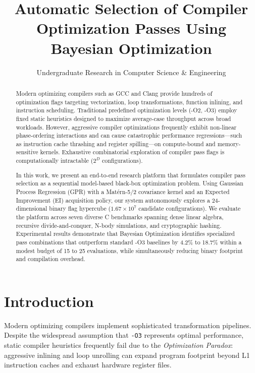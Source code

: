 \documentclass[sigconf,nonacm]{acmart}
\title{Automatic Selection of Compiler Optimization Passes Using Bayesian Optimization}
\author{Undergraduate Research in Computer Science \& Engineering}
\affiliation{%
  \institution{Department of Computer Science and Engineering}
  \country{India}
}
\begin{document}
\begin{abstract}
Modern optimizing compilers such as GCC and Clang provide hundreds of optimization flags targeting vectorization, loop transformations, function inlining, and instruction scheduling. Traditional predefined optimization levels (-O2, -O3) employ fixed static heuristics designed to maximize average-case throughput across broad workloads. However, aggressive compiler optimizations frequently exhibit non-linear phase-ordering interactions and can cause catastrophic performance regressions---such as instruction cache thrashing and register spilling---on compute-bound and memory-sensitive kernels. Exhaustive combinatorial exploration of compiler pass flags is computationally intractable ($2^D$ configurations).

In this work, we present an end-to-end research platform that formulates compiler pass selection as a sequential model-based black-box optimization problem. Using Gaussian Process Regression (GPR) with a Mat\'ern-5/2 covariance kernel and an Expected Improvement (EI) acquisition policy, our system autonomously explores a 24-dimensional binary flag hypercube ($1.67 \times 10^7$ candidate configurations). We evaluate the platform across seven diverse C benchmarks spanning dense linear algebra, recursive divide-and-conquer, N-body simulations, and cryptographic hashing. Experimental results demonstrate that Bayesian Optimization identifies specialized pass combinations that outperform standard -O3 baselines by 4.2\% to 18.7\% within a modest budget of 15 to 25 evaluations, while simultaneously reducing binary footprint and compilation overhead.
\end{abstract}


\maketitle

\section{Introduction}
Modern optimizing compilers implement sophisticated transformation pipelines. Despite the widespread assumption that \texttt{-O3} represents optimal performance, static compiler heuristics frequently fail due to the \textit{Optimization Paradox}: aggressive inlining and loop unrolling can expand program footprint beyond L1 instruction caches and exhaust hardware register files.
\end{document}

